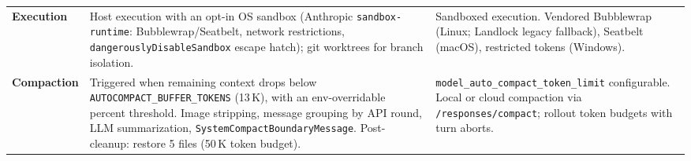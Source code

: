 \documentclass[11pt,a4paper]{article}
\begin{document}
\begin{table}[H]
\begin{tabularx}{\textwidth}{@{}L{2.5cm} L{5.5cm} L{5.5cm}@{}}
\addlinespace
\textbf{Execution} & Host execution with an opt-in OS sandbox (Anthropic \texttt{sandbox-runtime}: Bubblewrap/Seatbelt, network restrictions, \texttt{dangerouslyDisableSandbox} escape hatch); git worktrees for branch isolation. & Sandboxed execution. Vendored Bubblewrap (Linux; Landlock legacy fallback), Seatbelt (macOS), restricted tokens (Windows). \\
\addlinespace
\textbf{Compaction} & Triggered when remaining context drops below \texttt{AUTOCOMPACT\_BUFFER\_TOKENS} (13\,K), with an env-overridable percent threshold. Image stripping, message grouping by API round, LLM summarization, \texttt{SystemCompactBoundaryMessage}. Post-cleanup: restore 5 files (50\,K token budget). & \texttt{model\_auto\_compact\_token\_limit} configurable. Local or cloud compaction via \texttt{/responses/compact}; rollout token budgets with turn aborts. \\
\bottomrule
\end{tabularx}
\end{table}


\end{document}
